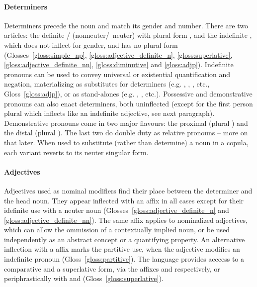 \paragraph{Determiners}
Determiners precede the noun and match its gender and number.
There are two articles: the definite / (nonneuter/~neuter) with plural form , and the indefinite , which does not inflect for gender, and has no plural form (Glosses~\ref{gloss:simple_np}, \ref{gloss:adjective_definite_n}, \ref{gloss:superlative}, \ref{gloss:adjective_definite_nn}, \ref{gloss:diminutive}{} and \ref{gloss:adjp}).
Indefinite pronouns can be used to convey universal or existential quantification and negation, materializing as substitutes for determiners (e.g. , , , etc., Gloss~\ref{gloss:adjp}), or as stand-alones (e.g. , , etc.).
Possessive and demonstrative pronouns can also enact determiners, both uninflected (except for the first person plural  which inflects like an indefinite adjective, see next paragraph).
Demonstrative pronouns come in two major flavours: the proximal  (plural ) and the distal  (plural ).
The last two do double duty as relative pronouns -- more on that later.
When used to substitute (rather than determine) a noun in a copula, each variant reverts to its neuter singular form. 

\paragraph{Adjectives}
Adjectives used as nominal modifiers find their place between the determiner and the head noun.
They appear inflected with an  affix in all cases except for their idefinite use with a neuter noun (Glosses~\ref{gloss:adjective_definite_n} and \ref{gloss:adjective_definite_nn}).
The same affix applies to nominalized adjectives, which can allow the ommission of a contextually implied noun, or be used independently as an abstract concept or a quantifying property.
An alternative inflection with a  affix marks the partitive use, when the adjective modifies an indefinite pronoun (Gloss~\ref{gloss:partitive}).
The language provides acccess to a comparative and a superlative form, via the affixes  and  respectively, or periphrastically with  and  (Gloss~\ref{gloss:superlative}).

